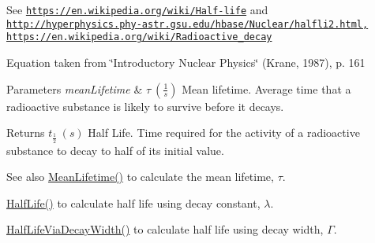 See \href{https://en.wikipedia.org/wiki/Half-life}{\tt https\+://en.\+wikipedia.\+org/wiki/\+Half-\/life} and \href{http://hyperphysics.phy-astr.gsu.edu/hbase/Nuclear/halfli2.html,}{\tt http\+://hyperphysics.\+phy-\/astr.\+gsu.\+edu/hbase/\+Nuclear/halfli2.\+html,} \href{https://en.wikipedia.org/wiki/Radioactive_decay}{\tt https\+://en.\+wikipedia.\+org/wiki/\+Radioactive\+\_\+decay}

Equation taken from \char`\"{}\+Introductory Nuclear Physics\char`\"{} (Krane, 1987), p. 161


\begin{DoxyParams}{Parameters}
{\em mean\+Lifetime} & $\tau\ (\frac{1}{s})$ Mean lifetime. Average time that a radioactive substance is likely to survive before it decays. \\
\hline
\end{DoxyParams}
\begin{DoxyReturn}{Returns}
$t_{\frac{1}{2}}\ (s)$ Half Life. Time required for the activity of a radioactive substance to decay to half of its initial value. 
\end{DoxyReturn}
\begin{DoxySeeAlso}{See also}
\mbox{\hyperlink{group___atomic_gaa9e3c2deedda4bc7a745568b06fc47eb}{Mean\+Lifetime()}} to calculate the mean lifetime, $\tau$. 

\mbox{\hyperlink{group___half_life_ga21d268f154fb91c1c556bbfa7fe83ac1}{Half\+Life()}} to calculate half life using decay constant, $\lambda$. 

\mbox{\hyperlink{group___half_life_gaba3fda944d1a68ee1016a1f2f5809359}{Half\+Life\+Via\+Decay\+Width()}} to calculate half life using decay width, $\Gamma$. 
\end{DoxySeeAlso}
